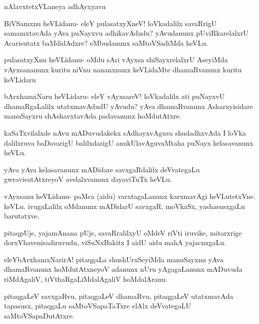 \documentclass{article}
\begin{document}
\begin{center}
{\textbf\large{nAlavxtetxVLaneya adhAyxyavu}}
\end{center}

\begin{mng}%
BiVSamxnu heVLidanu- eleY pulasatxyXneV! loVkadalilx savaRrigU
samamxtavAda yAva puNayxvu adhikavAdudu? yAvudanunx pUviRkarelalxrU
Acarisutatx baMdidAdxre? eMbudanunx saMtoVSadiMda heVLu.
\end{mng}

\begin{mng}%
pulasatxyXnu heVLidanu- oMdu sAri vAyxsa shiSayxrelalxrU AseyiMda
vAyxsananunx kuritu niVnu nananxnunx keVLidaMte dhamaRvanunx kuritu keVLidaru
\end{mng}

\begin{mng}%
bArxhamxNaru heVLidaru- eleY vAyxsareV! loVkadalilx ati puNayxvU
dhamaRgaLalilx utatxmavAdudU yAvudu? yAva dhamaRvanunx Asharxyisidare
manuSayxru shAshavxtavAda padavanunx hoMdutAtxre.
\end{mng}

\begin{mng}%
kaSaTxvilalxde nAvu mADuvudakekx sAdhayxvAguva shudadhxvAda I loVka
dalilxruva baDavarigU balilxdarigU anukUlavAguvaMtaha puNayx kelasavanunx 
heVLu.
\end{mng}

\begin{mng}%
yAva yAva kelasavanunx mADidare savxgaRdalilx deVvategaLu gwravisutAtxreyoV
avelalxvanunx dayaviTuTx heVLu.
\end{mng}

\begin{mng}%
vAyxsanu heVLidanu- paMca (aidu) varxtagaLanunx karxmavAgi heVLutetxVne.
keVLu. ivugaLalilx oMdanunx mADidarU savxgaR, moVkaSx, yashasusxgaLu
barutatxve.
\end{mng}

\begin{mng}%
pitaqpUje, yajamAnana pUje, savaRralilxyU oMdeV riVti iruvike,
mitarxrige dorxVhavenisadiruvudu, viSuNxBakitx I aidU aidu mahA
yajacnxgaLu.
\end{mng}

\begin{mng}%
eleYbArxhamxNarirA! pitaqgaLa shushUrxSeyiMda manuSayxnu yAva
dhamaRvanunx hoMdutAtxneyoV adanunx nUru yAgagaLanunx mADuvuda
riMdAgaliV, tiVthaRgaLiMdalAgaliV hoMdalAranu.
\end{mng}

\begin{mng}%
pitaqgaLeV savxgaRvu, pitaqgaLeV dhamaRvu, pitaqgaLeV utatxmavAda
tapasusx, pitaqgaLu saMtoVSapaTaTxre elAlx deVvategaLU saMtoVSapaDutAtxre.
\end{mng}
\end{document}
